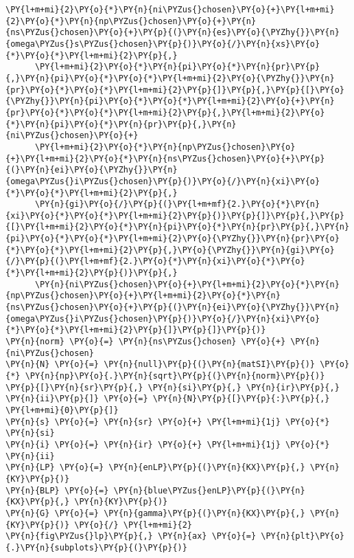 \begin{Verbatim}[commandchars=\\\{\}]
      \PY{l+m+mi}{2}\PY{o}{*}\PY{n}{ni\PYZus{}chosen}\PY{o}{+}\PY{l+m+mi}{2}\PY{o}{*}\PY{n}{np\PYZus{}chosen}\PY{o}{+}\PY{n}{ns\PYZus{}chosen}\PY{o}{+}\PY{p}{(}\PY{n}{es}\PY{o}{\PYZhy{}}\PY{n}{omega\PYZus{}s\PYZus{}chosen}\PY{p}{)}\PY{o}{/}\PY{n}{xs}\PY{o}{*}\PY{o}{*}\PY{l+m+mi}{2}\PY{p}{,}
      \PY{l+m+mi}{2}\PY{o}{*}\PY{n}{pi}\PY{o}{*}\PY{n}{pr}\PY{p}{,}\PY{n}{pi}\PY{o}{*}\PY{o}{*}\PY{l+m+mi}{2}\PY{o}{\PYZhy{}}\PY{n}{pr}\PY{o}{*}\PY{o}{*}\PY{l+m+mi}{2}\PY{p}{]}\PY{p}{,}\PY{p}{[}\PY{o}{\PYZhy{}}\PY{n}{pi}\PY{o}{*}\PY{o}{*}\PY{l+m+mi}{2}\PY{o}{+}\PY{n}{pr}\PY{o}{*}\PY{o}{*}\PY{l+m+mi}{2}\PY{p}{,}\PY{l+m+mi}{2}\PY{o}{*}\PY{n}{pi}\PY{o}{*}\PY{n}{pr}\PY{p}{,}\PY{n}{ni\PYZus{}chosen}\PY{o}{+}
      \PY{l+m+mi}{2}\PY{o}{*}\PY{n}{np\PYZus{}chosen}\PY{o}{+}\PY{l+m+mi}{2}\PY{o}{*}\PY{n}{ns\PYZus{}chosen}\PY{o}{+}\PY{p}{(}\PY{n}{ei}\PY{o}{\PYZhy{}}\PY{n}{omega\PYZus{}i\PYZus{}chosen}\PY{p}{)}\PY{o}{/}\PY{n}{xi}\PY{o}{*}\PY{o}{*}\PY{l+m+mi}{2}\PY{p}{,}
      \PY{n}{gi}\PY{o}{/}\PY{p}{(}\PY{l+m+mf}{2.}\PY{o}{*}\PY{n}{xi}\PY{o}{*}\PY{o}{*}\PY{l+m+mi}{2}\PY{p}{)}\PY{p}{]}\PY{p}{,}\PY{p}{[}\PY{l+m+mi}{2}\PY{o}{*}\PY{n}{pi}\PY{o}{*}\PY{n}{pr}\PY{p}{,}\PY{n}{pi}\PY{o}{*}\PY{o}{*}\PY{l+m+mi}{2}\PY{o}{\PYZhy{}}\PY{n}{pr}\PY{o}{*}\PY{o}{*}\PY{l+m+mi}{2}\PY{p}{,}\PY{o}{\PYZhy{}}\PY{n}{gi}\PY{o}{/}\PY{p}{(}\PY{l+m+mf}{2.}\PY{o}{*}\PY{n}{xi}\PY{o}{*}\PY{o}{*}\PY{l+m+mi}{2}\PY{p}{)}\PY{p}{,}
      \PY{n}{ni\PYZus{}chosen}\PY{o}{+}\PY{l+m+mi}{2}\PY{o}{*}\PY{n}{np\PYZus{}chosen}\PY{o}{+}\PY{l+m+mi}{2}\PY{o}{*}\PY{n}{ns\PYZus{}chosen}\PY{o}{+}\PY{p}{(}\PY{n}{ei}\PY{o}{\PYZhy{}}\PY{n}{omega\PYZus{}i\PYZus{}chosen}\PY{p}{)}\PY{o}{/}\PY{n}{xi}\PY{o}{*}\PY{o}{*}\PY{l+m+mi}{2}\PY{p}{]}\PY{p}{]}\PY{p}{)}
\PY{n}{norm} \PY{o}{=} \PY{n}{ns\PYZus{}chosen} \PY{o}{+} \PY{n}{ni\PYZus{}chosen}
\PY{n}{N} \PY{o}{=} \PY{n}{null}\PY{p}{(}\PY{n}{matSI}\PY{p}{)} \PY{o}{*} \PY{n}{np}\PY{o}{.}\PY{n}{sqrt}\PY{p}{(}\PY{n}{norm}\PY{p}{)}
\PY{p}{[}\PY{n}{sr}\PY{p}{,} \PY{n}{si}\PY{p}{,} \PY{n}{ir}\PY{p}{,} \PY{n}{ii}\PY{p}{]} \PY{o}{=} \PY{n}{N}\PY{p}{[}\PY{p}{:}\PY{p}{,} \PY{l+m+mi}{0}\PY{p}{]}
\PY{n}{s} \PY{o}{=} \PY{n}{sr} \PY{o}{+} \PY{l+m+mi}{1j} \PY{o}{*} \PY{n}{si}
\PY{n}{i} \PY{o}{=} \PY{n}{ir} \PY{o}{+} \PY{l+m+mi}{1j} \PY{o}{*} \PY{n}{ii}
\PY{n}{LP} \PY{o}{=} \PY{n}{enLP}\PY{p}{(}\PY{n}{KX}\PY{p}{,} \PY{n}{KY}\PY{p}{)}
\PY{n}{BLP} \PY{o}{=} \PY{n}{blue\PYZus{}enLP}\PY{p}{(}\PY{n}{KX}\PY{p}{,} \PY{n}{KY}\PY{p}{)}
\PY{n}{G} \PY{o}{=} \PY{n}{gamma}\PY{p}{(}\PY{n}{KX}\PY{p}{,} \PY{n}{KY}\PY{p}{)} \PY{o}{/} \PY{l+m+mi}{2}
\PY{n}{fig\PYZus{}lp}\PY{p}{,} \PY{n}{ax} \PY{o}{=} \PY{n}{plt}\PY{o}{.}\PY{n}{subplots}\PY{p}{(}\PY{p}{)}

\end{Verbatim}
